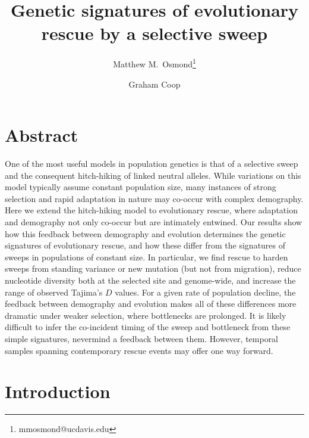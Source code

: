 \documentclass[]{article}
\title{Genetic signatures of evolutionary rescue by a selective sweep}
\author[*]{Matthew M.\ Osmond\thanks{mmosmond@ucdavis.edu}}
\author[*]{Graham Coop}
\affil[*]{Center for Population Biology and Department of Evolution and Ecology, University of California, Davis, California 95616}
\date{}
\begin{document}

\maketitle

\section*{Abstract}
\label{sec:abstract}

One of the most useful models in population genetics is that of a selective sweep and the consequent hitch-hiking of linked neutral alleles.
While variations on this model typically assume constant population size, many instances of strong selection and rapid adaptation in nature may co-occur with complex demography.
Here we extend the hitch-hiking model to evolutionary rescue, where adaptation and demography not only co-occur but are intimately entwined. 
Our results show how this feedback between demography and evolution determines the genetic signatures of evolutionary rescue, and how these differ from the signatures of sweeps in populations of constant size.
In particular, we find rescue to harden sweeps from standing variance or new mutation (but not from migration), reduce nucleotide diversity both at the selected site and genome-wide, and increase the range of observed Tajima's $D$ values.
For a given rate of population decline, the feedback between demography and evolution makes all of these differences more dramatic under weaker selection, where bottlenecks are prolonged. 
It is likely difficult to infer the co-incident timing of the sweep and bottleneck from these simple signatures, nevermind a feedback between them. 
However, temporal samples spanning contemporary rescue events may offer one way forward.

\section*{Introduction}
\label{sec:intro}
\end{document}
